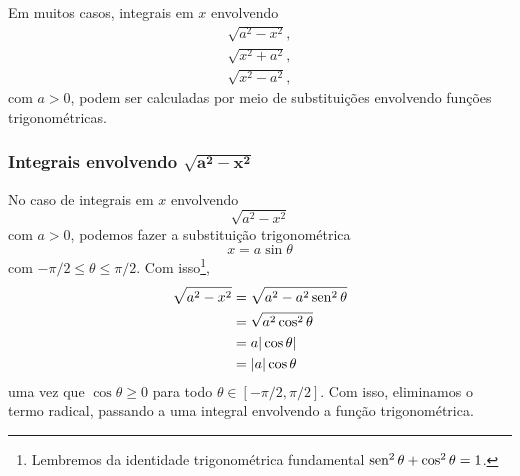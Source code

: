 Em muitos casos, integrais em $x$ envolvendo
\begin{gather}
  \sqrt{a^2 - x^2},\\
  \sqrt{x^2 + a^2},\\
  \sqrt{x^2 - a^2},
\end{gather}
com $a>0$, podem ser calculadas por meio de substituições envolvendo funções trigonométricas.

\subsubsection{Integrais envolvendo $\pmb{\sqrt{a^2 - x^2}}$}

No caso de integrais em $x$ envolvendo
\begin{equation}
  \sqrt{a^2 - x^2}
\end{equation}
com $a>0$, podemos fazer a substituição trigonométrica
\begin{equation}
  x = a\sin\theta
\end{equation}
com $-\pi/2\leq\theta\leq\pi/2$. Com isso\footnote{Lembremos da identidade trigonométrica fundamental  $\operatorname{sen}^2 \theta + \cos^2 \theta = 1 $.},
\begin{align}
  \sqrt{a^2 - x^2} &= \sqrt{a^2 - a^2\operatorname{sen}^2\theta}\\
                   &= \sqrt{a^2\cos^2\theta}\\
                   &= a|\cos\theta|\\
                   &= |a|\cos\theta
\end{align}
uma vez que $\cos\theta \geq 0$ para todo $\theta\in [-\pi/2,\pi/2]$. Com isso, eliminamos o termo radical, passando a uma integral envolvendo a função trigonométrica.

